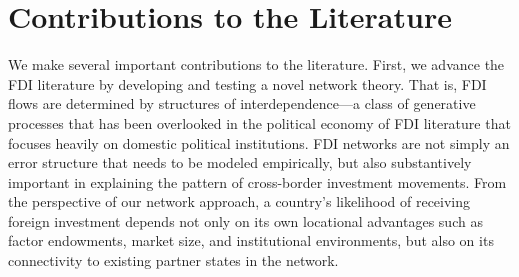 \documentclass[reqno,onecolumn,letterpaper,12pt]{article}
\begin{document}
{\section{Contributions to the Literature}

We make several important contributions to the literature. First, we advance the FDI literature by developing and testing a novel network theory. That is, FDI flows are determined by structures of interdependence---a class of generative processes that has been overlooked in the political economy of FDI literature that focuses heavily on domestic political institutions. %
FDI networks are not simply an error structure that needs to be modeled empirically, but also substantively important in explaining the pattern of cross-border investment movements. From the perspective of our network approach, a country's likelihood of receiving foreign investment depends not only on its own locational advantages such as factor endowments, market size, and institutional environments, but also on its connectivity to existing partner states in the network. %

}
\end{document}
